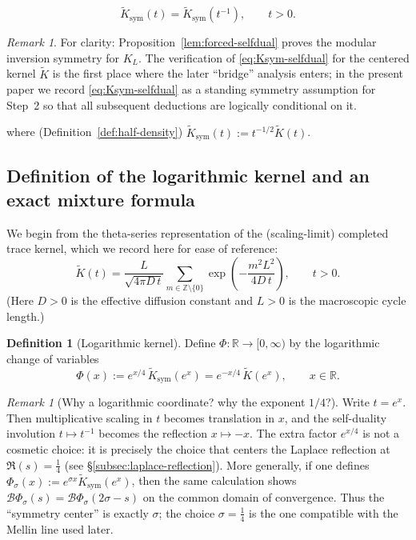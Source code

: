 \documentclass[12pt]{amsart}
\theoremstyle{definition}
\newtheorem{definition}[theorem]{Definition}
\theoremstyle{remark}
\newtheorem{remark}[theorem]{Remark}
\begin{document}
\begin{equation}
\label{eq:Ksym-selfdual}
\widetilde K_{\mathrm{sym}}(t)=\widetilde K_{\mathrm{sym}}(t^{-1}),\qquad t>0.
\end{equation}

\begin{remark}
For clarity: Proposition~\ref{lem:forced-selfdual} proves the modular inversion symmetry for $K_L$.
The verification of \eqref{eq:Ksym-selfdual} for the centered kernel $\widetilde K$ is the first
place where the later ``bridge'' analysis enters; in the present paper we record \eqref{eq:Ksym-selfdual}
as a standing symmetry assumption for Step~2 so that all subsequent deductions are logically conditional on it.
\end{remark}

where (Definition~\ref{def:half-density}) $\widetilde K_{\mathrm{sym}}(t):=t^{-1/2}\widetilde K(t)$.

\subsection{Definition of the logarithmic kernel and an exact mixture formula}
\label{subsec:phi-def}

We begin from the theta-series representation of the (scaling-limit) completed trace kernel,
which we record here for ease of reference:
\begin{equation}
\label{eq:Ktilde-theta}
\widetilde K(t)
=
\frac{L}{\sqrt{4\pi D\,t}}
\sum_{m\in\mathbb Z\setminus\{0\}}
\exp\!\left(-\frac{m^2L^2}{4D\,t}\right),
\qquad t>0.
\end{equation}
(Here $D>0$ is the effective diffusion constant and $L>0$ is the macroscopic cycle length.)

\medskip

\begin{definition}[Logarithmic kernel]
\label{def:Phi}
Define $\Phi:\mathbb R\to[0,\infty)$ by the logarithmic change of variables
\begin{equation}
\label{eq:Phi-def}
\Phi(x)
:=
e^{x/4}\,\widetilde K_{\mathrm{sym}}(e^{x})
=
e^{-x/4}\,\widetilde K(e^{x}),
\qquad x\in\mathbb R.
\end{equation}
\end{definition}

\begin{remark}[Why a logarithmic coordinate? why the exponent $1/4$?]
Write $t=e^{x}$. Then multiplicative scaling in $t$ becomes translation in $x$, and the
self-duality involution $t\mapsto t^{-1}$ becomes the reflection $x\mapsto -x$.
The extra factor $e^{x/4}$ is not a cosmetic choice: it is precisely the choice that
centers the Laplace reflection at $\Re(s)=\tfrac14$ (see \S\ref{subsec:laplace-reflection}).
More generally, if one defines $\Phi_\sigma(x):=e^{\sigma x}\widetilde K_{\mathrm{sym}}(e^x)$,
then the same calculation shows $\mathcal B\Phi_\sigma(s)=\mathcal B\Phi_\sigma(2\sigma-s)$
on the common domain of convergence. Thus the ``symmetry center'' is exactly $\sigma$; the
choice $\sigma=\tfrac14$ is the one compatible with the Mellin line used later.
\end{remark}
\end{document}
